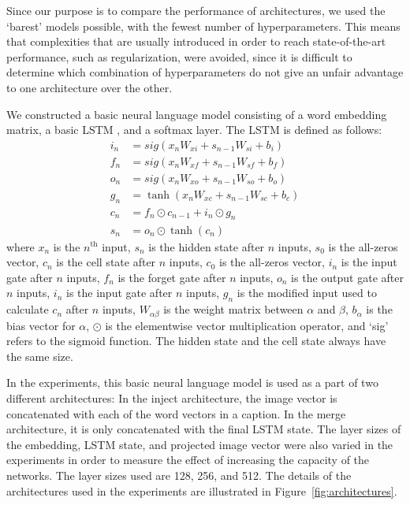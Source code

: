 \documentclass[11pt,letterpaper]{article}
\begin{document}
Since our purpose is to compare the performance of architectures, we used the `barest' models possible, with the fewest number of hyperparameters. This means that complexities that are usually introduced in order to reach state-of-the-art performance, such as regularization, were avoided, since it is difficult to determine which combination of hyperparameters do not give an unfair advantage to one architecture over the other.

We constructed a basic neural language model consisting of a word embedding matrix, a basic LSTM \cite{Hochreiter1997}, and a softmax layer. The LSTM is defined as follows:
\begin{align}
i_n &= sig(x_n W_{xi} + s_{n-1} W_{si} + b_i) \\
f_n &= sig(x_n W_{xf} + s_{n-1} W_{sf} + b_f) \\
o_n &= sig(x_n W_{xo} + s_{n-1} W_{so} + b_o) \\
g_n &= \tanh(x_n W_{xc} + s_{n-1} W_{sc} + b_c) \\
c_n &= f_n \odot c_{n-1} + i_n \odot g_n \\
s_n &= o_n \odot \tanh(c_n)
\end{align}
where $x_n$ is the $n^\text{th}$ input, $s_n$ is the hidden state after $n$ inputs, $s_0$ is the all-zeros vector, $c_n$ is the cell state after $n$ inputs, $c_0$ is the all-zeros vector, $i_n$ is the input gate after $n$ inputs, $f_n$ is the forget gate after $n$ inputs, $o_n$ is the output gate after $n$ inputs, $i_n$ is the input gate after $n$ inputs, $g_n$ is the modified input used to calculate $c_n$ after $n$ inputs, $W_{\alpha \beta}$ is the weight matrix between $\alpha$ and $\beta$, $b_\alpha$ is the bias vector for $\alpha$, $\odot$ is the elementwise vector multiplication operator, and `sig' refers to the sigmoid function. The hidden state and the cell state always have the same size.

In the experiments, this basic neural language model is used as a part of two different architectures: In the inject architecture, the image vector is concatenated with each of the word vectors in a caption. In the merge architecture, it is only concatenated with the final LSTM state. The layer sizes of the embedding, LSTM state, and projected image vector were also varied in the experiments in order to measure the effect of increasing the capacity of the networks. The layer sizes used are 128, 256, and 512. The details of the architectures used in the experiments are illustrated in Figure~\ref{fig:architectures}. 
\end{document}

